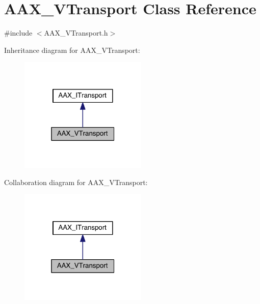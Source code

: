 \hypertarget{a00141}{}\section{A\+A\+X\+\_\+\+V\+Transport Class Reference}
\label{a00141}


{\ttfamily \#include $<$A\+A\+X\+\_\+\+V\+Transport.\+h$>$}



Inheritance diagram for A\+A\+X\+\_\+\+V\+Transport\+:
\nopagebreak
\begin{figure}[H]
\begin{center}
\leavevmode
\includegraphics[width=172pt]{a00719}
\end{center}
\end{figure}


Collaboration diagram for A\+A\+X\+\_\+\+V\+Transport\+:
\nopagebreak
\begin{figure}[H]
\begin{center}
\leavevmode
\includegraphics[width=172pt]{a00720}
\end{center}
\end{figure}


